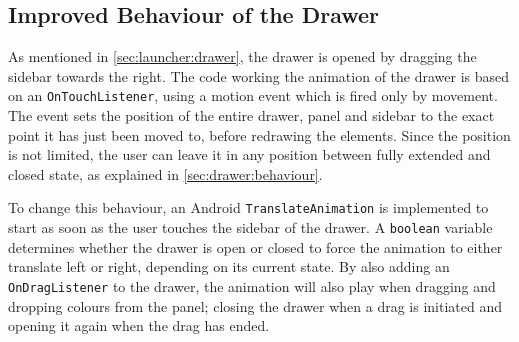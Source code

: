 \subsection{Improved Behaviour of the Drawer}\label{sec:developments:drawerimprovements}
As mentioned in \cref{sec:launcher:drawer}, the drawer is opened by dragging the sidebar towards the right.
The code working the animation of the drawer is based on an \lstinline|OnTouchListener|, using a motion event which is fired only by movement.
The event sets the position of the entire drawer, panel and sidebar to the exact point it has just been moved to, before redrawing the elements.
Since the position is not limited, the user can leave it in any position between fully extended and closed state, as explained in \cref{sec:drawer:behaviour}.

To change this behaviour, an Android \lstinline{TranslateAnimation} is implemented to start as soon as the user touches the sidebar of the drawer.
A \lstinline{boolean} variable determines whether the drawer is open or closed to force the animation to either translate left or right, depending on its current state.
By also adding an \lstinline{OnDragListener} to the drawer, the animation will also play when dragging and dropping colours from the panel; closing the drawer when a drag is initiated and opening it again when the drag has ended.